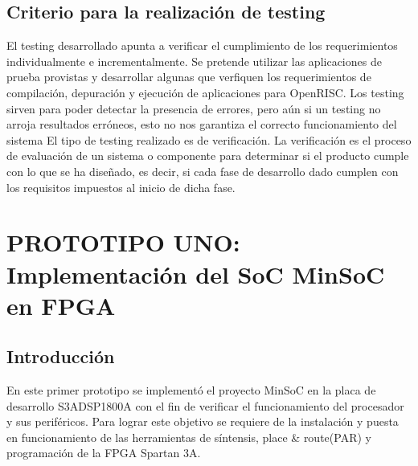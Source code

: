 		\subsection{Criterio para la realización de testing}%
		El testing desarrollado apunta a verificar el cumplimiento de los requerimientos individualmente e incrementalmente. Se pretende utilizar las
		aplicaciones de prueba provistas y desarrollar algunas que verfiquen los requerimientos de compilación, depuración y ejecución de aplicaciones para
		OpenRISC. 
		Los testing sirven para poder detectar la presencia de errores, pero aún si un testing no arroja resultados erróneos, esto no nos garantiza el
		correcto funcionamiento del sistema El tipo de testing realizado es de verificación. La verificación es el proceso de evaluación de un sistema o
		componente para determinar si el producto cumple con lo que se ha diseñado, es decir, si cada fase de desarrollo dado cumplen con los requisitos
		impuestos al inicio de dicha fase.

	\newpage
	\section{PROTOTIPO UNO: Implementación del SoC MinSoC en FPGA}
		\subsection{Introducción}
		
	En este primer prototipo se implementó el proyecto MinSoC en la placa de desarrollo S3ADSP1800A con el fin de verificar el funcionamiento del procesador y sus periféricos. Para lograr este objetivo se requiere de la instalación y puesta en funcionamiento de las herramientas de síntensis, place \& route(PAR) y programación de la FPGA Spartan 3A. 


